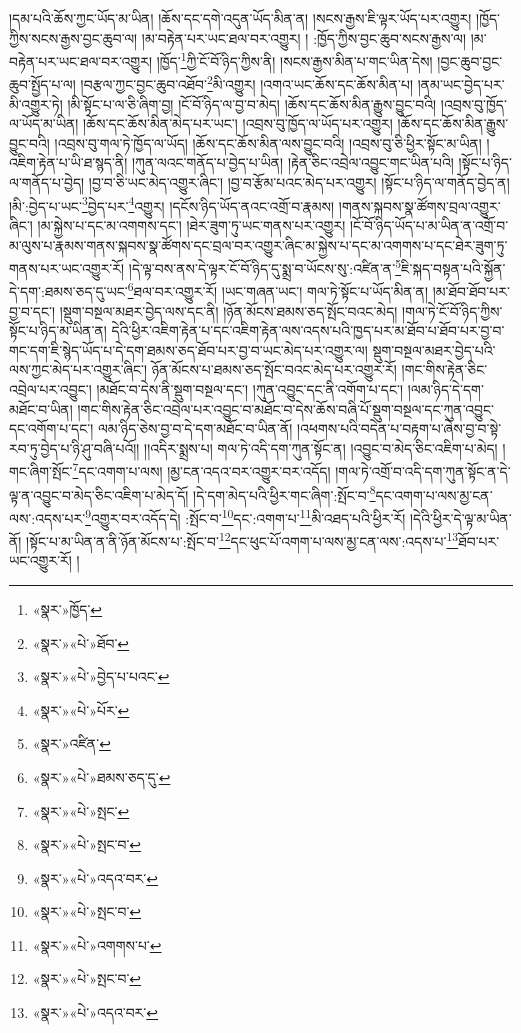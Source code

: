 །དམ་པའི་ཆོས་ཀྱང་ཡོད་མ་ཡིན། །ཆོས་དང་དགེ་འདུན་ཡོད་མིན་ན། །སངས་རྒྱས་ཇི་ལྟར་ཡོད་པར་འགྱུར། །ཁྱོད་ཀྱིས་སངས་རྒྱས་བྱང་ཆུབ་ལ། །མ་བརྟེན་པར་ཡང་ཐལ་བར་འགྱུར། །
:ཁྱོད་ཀྱིས་བྱང་ཆུབ་སངས་རྒྱས་ལ། །མ་བརྟེན་པར་ཡང་ཐལ་བར་འགྱུར། །ཁྱོད་\footnote{«སྣར་»ཁྱོད་}ཀྱི་ངོ་བོ་ཉིད་ཀྱིས་ནི། །སངས་རྒྱས་མིན་པ་གང་ཡིན་དེས། །བྱང་ཆུབ་བྱང་ཆུབ་སྤྱོད་པ་ལ། །བརྩལ་ཀྱང་བྱང་ཆུབ་འཐོབ་\footnote{«སྣར་»«པེ་»ཐོབ་}མི་འགྱུར། །འགའ་ཡང་ཆོས་དང་ཆོས་མིན་པ། །ནམ་ཡང་བྱེད་པར་མི་འགྱུར་ཏེ། །མི་སྟོང་པ་ལ་ཅི་ཞིག་བྱ། །ངོ་བོ་ཉིད་ལ་བྱ་བ་མེད། །ཆོས་དང་ཆོས་མིན་རྒྱུས་བྱུང་བའི། །འབྲས་བུ་ཁྱོད་ལ་ཡོད་མ་ཡིན། །ཆོས་དང་ཆོས་མིན་མེད་པར་ཡང་། །འབྲས་བུ་ཁྱོད་ལ་ཡོད་པར་འགྱུར། །ཆོས་དང་ཆོས་མིན་རྒྱུས་བྱུང་བའི། །འབྲས་བུ་གལ་ཏེ་ཁྱོད་ལ་ཡོད། །ཆོས་དང་ཆོས་མིན་ལས་བྱུང་བའི། །འབྲས་བུ་ཅི་ཕྱིར་སྟོང་མ་ཡིན། །འཇིག་རྟེན་པ་ཡི་ཐ་སྙད་ནི། །ཀུན་ལའང་གནོད་པ་བྱེད་པ་ཡིན། །རྟེན་ཅིང་འབྲེལ་འབྱུང་གང་ཡིན་པའི། །སྟོང་པ་ཉིད་ལ་གནོད་པ་བྱེད། །བྱ་བ་ཅི་ཡང་མེད་འགྱུར་ཞིང་། །བྱ་བ་རྩོམ་པའང་མེད་པར་འགྱུར། །སྟོང་པ་ཉིད་ལ་གནོད་བྱེད་ན། །མི་:བྱེད་པ་ཡང་\footnote{«སྣར་»«པེ་»བྱེད་པ་པའང་}བྱེད་པར་\footnote{«སྣར་»«པེ་»པོར་}འགྱུར། །དངོས་ཉིད་ཡོད་ནའང་འགྲོ་བ་རྣམས། །གནས་སྐབས་སྣ་ཚོགས་བྲལ་འགྱུར་ཞིང་། །མ་སྐྱེས་པ་དང་མ་འགགས་དང་། །ཐེར་ཟུག་ཏུ་ཡང་གནས་པར་འགྱུར། །ངོ་བོ་ཉིད་ཡོད་པ་མ་ཡིན་ན་འགྲོ་བ་མ་ལུས་པ་རྣམས་གནས་སྐབས་སྣ་ཚོགས་དང་བྲལ་བར་འགྱུར་ཞིང་མ་སྐྱེས་པ་དང་མ་འགགས་པ་དང་ཐེར་ཟུག་ཏུ་གནས་པར་ཡང་འགྱུར་རོ། །དེ་ལྟ་བས་ནས་དེ་ལྟར་ངོ་བོ་ཉིད་དུ་སྨྲ་བ་ཡོངས་སུ་:འཛིན་ན་\footnote{«སྣར་»འཛིན་}ཇི་སྐད་བསྟན་པའི་སྐྱོན་དེ་དག་:ཐམས་ཅད་དུ་ཡང་\footnote{«སྣར་»«པེ་»ཐམས་ཅད་དུ་}ཐལ་བར་འགྱུར་རོ། །ཡང་གཞན་ཡང་། གལ་ཏེ་སྟོང་པ་ཡོད་མིན་ན། །མ་ཐོབ་ཐོབ་པར་བྱ་བ་དང་། །སྡུག་བསྔལ་མཐར་བྱེད་ལས་དང་ནི། །ཉོན་མོངས་ཐམས་ཅད་སྤོང་བའང་མེད། །གལ་ཏེ་ངོ་བོ་ཉིད་ཀྱིས་སྟོང་པ་ཉིད་མ་ཡིན་ན། དེའི་ཕྱིར་འཇིག་རྟེན་པ་དང་འཇིག་རྟེན་ལས་འདས་པའི་ཁྱད་པར་མ་ཐོབ་པ་ཐོབ་པར་བྱ་བ་གང་དག་ཇི་སྙེད་ཡོད་པ་དེ་དག་ཐམས་ཅད་ཐོབ་པར་བྱ་བ་ཡང་མེད་པར་འགྱུར་ལ། སྡུག་བསྔལ་མཐར་བྱེད་པའི་ལས་ཀྱང་མེད་པར་འགྱུར་ཞིང་། ཉོན་མོངས་པ་ཐམས་ཅད་སྤོང་བའང་མེད་པར་འགྱུར་རོ། །གང་གིས་རྟེན་ཅིང་འབྲེལ་པར་འབྱུང་། །མཐོང་བ་དེས་ནི་སྡུག་བསྔལ་དང་། །ཀུན་འབྱུང་དང་ནི་འགོག་པ་དང་། །ལམ་ཉིད་དེ་དག་མཐོང་བ་ཡིན། །གང་གིས་རྟེན་ཅིང་འབྲེལ་པར་འབྱུང་བ་མཐོང་བ་དེས་ཆོས་བཞི་པོ་སྡུག་བསྔལ་དང་ཀུན་འབྱུང་དང་འགོག་པ་དང་། ལམ་ཉིད་ཅེས་བྱ་བ་དེ་དག་མཐོང་བ་ཡིན་ནོ། །འཕགས་པའི་བདེན་པ་བརྟག་པ་ཞེས་བྱ་བ་སྟེ་རབ་ཏུ་བྱེད་པ་ཉི་ཤུ་བཞི་པའོ།། །།འདིར་སྨྲས་པ། གལ་ཏེ་འདི་དག་ཀུན་སྟོང་ན། །འབྱུང་བ་མེད་ཅིང་འཇིག་པ་མེད། །གང་ཞིག་སྤོང་\footnote{«སྣར་»«པེ་»སྤང་}དང་འགག་པ་ལས། །མྱ་ངན་འདའ་བར་འགྱུར་བར་འདོད། །གལ་ཏེ་འགྲོ་བ་འདི་དག་ཀུན་སྟོང་ན་དེ་ལྟ་ན་འབྱུང་བ་མེད་ཅིང་འཇིག་པ་མེད་དོ། །དེ་དག་མེད་པའི་ཕྱིར་གང་ཞིག་:སྤོང་བ་\footnote{«སྣར་»«པེ་»སྤང་བ་}དང་འགག་པ་ལས་མྱ་ངན་ལས་:འདས་པར་\footnote{«སྣར་»«པེ་»འདའ་བར་}འགྱུར་བར་འདོད་དེ། :སྤོང་བ་\footnote{«སྣར་»«པེ་»སྤང་བ་}དང་:འགག་པ་\footnote{«སྣར་»«པེ་»འགགས་པ་}མི་འཐད་པའི་ཕྱིར་རོ། །དེའི་ཕྱིར་དེ་ལྟ་མ་ཡིན་ནོ། །སྟོང་པ་མ་ཡིན་ན་ནི་ཉོན་མོངས་པ་:སྤོང་བ་\footnote{«སྣར་»«པེ་»སྤང་བ་}དང་ཕུང་པོ་འགག་པ་ལས་མྱ་ངན་ལས་:འདས་པ་\footnote{«སྣར་»«པེ་»འདའ་བར་}ཐོབ་པར་ཡང་འགྱུར་རོ། །
